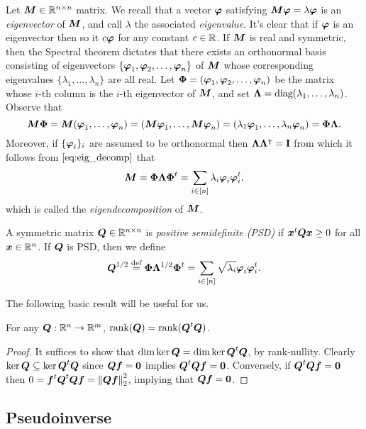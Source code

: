 Let ${\vb*{M}}\in\mathbb{R}^{n\times n}$ matrix. We recall that a vector $\vb*{\varphi}$ satisfying ${\vb*{M}}\vb*{\varphi}=\lambda\vb*{\varphi}$ is an \emph{eigenvector} of ${\vb*{M}}$, and call $\lambda$ the associated \emph{eigenvalue}. It's clear that if $\vb*{\varphi}$ is an eigenvector then so it $c\vb*{\varphi}$ for any constant $c\in \mathbb{R}$. If ${\vb*{M}}$ is real and symmetric, then the Spectral theorem dictates that there exists an orthonormal basis consisting of eigenvectors $\{\vb*{\varphi}_1,\vb*{\varphi}_2,\dots,\vb*{\varphi}_n\}$ of ${\vb*{M}}$ whose corresponding eigenvalues $\{\lambda_1,\dots,\lambda_n\}$ are all real. Let $\boldsymbol{\Phi}=(\vb*{\varphi}_1,\vb*{\varphi}_2,\dots,\vb*{\varphi}_n)$ be the matrix whose $i$-th column is the $i$-th eigenvector of ${\vb*{M}}$, and set $\vb{\Lambda}=\text{diag}(\lambda_1,\dots,\lambda_n)$. Observe that 
\begin{equation}
\label{eq:eig_decomp}
{\vb*{M}}\boldsymbol{\Phi}={\vb*{M}}(\vb*{\varphi}_1,\dots,\vb*{\varphi}_n)=({\vb*{M}}\vb*{\varphi}_1,\dots,{\vb*{M}}\vb*{\varphi}_n)=(\lambda_1\vb*{\varphi}_1,\dots,\lambda_n\vb*{\varphi}_n)=\boldsymbol{\Phi}\vb{\Lambda}.
\end{equation}
Moreover, if $\{\vb*{\varphi}_i\}_i$ are assumed to be orthonormal then $\vb{\Lambda}\vb{\Lambda}^\intercal=\vb{I}$ from which it follows from $\eqref{eq:eig_decomp}$ that \begin{equation}
    \label{eq:eig_decomp2}
    {\vb*{M}}=\boldsymbol{\Phi}\vb{\Lambda}\boldsymbol{\Phi}^t = \sum_{i\in[n]}\lambda_i\vb*{\varphi}_i\vb*{\varphi}_i^t,
\end{equation}
which is called the \emph{eigendecomposition} of ${\vb*{M}}$. 

A symmetric matrix $\vb*{Q}\in\mathbb{R}^{n\times n}$ is \emph{positive semidefinite (PSD)} if $\vb*{x}^t\vb*{Q}\vb*{x} \geq 0$ for all $\vb*{x}\in\mathbb{R}^n$. If $\vb*{Q}$ is PSD, then we define 
\begin{equation*}
    \vb*{Q}^{1/2} \overset{\text{def}}{=} \boldsymbol{\Phi}\vb{\Lambda}^{1/2}\boldsymbol{\Phi}^t = \sum_{i\in[n]}\sqrt{\lambda_i}\vb*{\varphi}_i\vb*{\varphi}_i^t.
\end{equation*}

The following basic result will be useful for us. 

\begin{lemma}
	\label{lem:rank(QtQ)}
	For any $\vb*{Q}:\mathbb{R}^n\to\mathbb{R}^m$, $\rank(\vb*{Q}) = \rank(\vb*{Q}^t\vb*{Q})$. 
\end{lemma}
\begin{proof}
	It suffices to show that $\dim\ker\vb*{Q} = \dim\ker\vb*{Q}^t \vb*{Q}$, by rank-nullity. Clearly $\ker\vb*{Q} \subseteq \ker\vb*{Q}^t\vb*{Q}$ since $\vb*{Q}\vb*{f}=\vb{0}$ implies $\vb*{Q}^t\vb*{Q}\vb*{f}=\vb{0}$. Conversely, if $\vb*{Q}^t\vb*{Q}\vb*{f}=\vb{0}$ then $0=\vb*{f}^t \vb*{Q}^t \vb*{Q}\vb*{f} = \norm{\vb*{Q}\vb*{f}}_2^2$, implying that $\vb*{Q}\vb*{f}=\vb{0}$.  
\end{proof}

\subsection{Pseudoinverse}
\label{sec:background_pseudoinverse}

